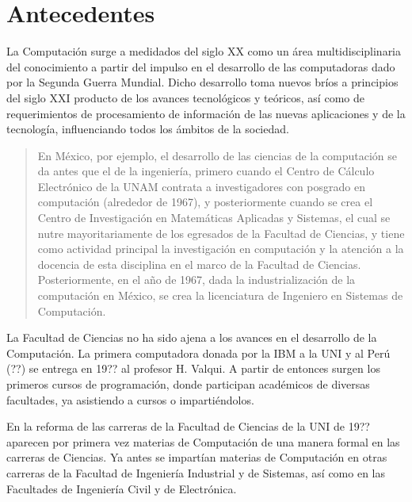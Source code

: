 \section{Antecedentes}\label{sec:cs-antecedentes}

La Computaci\'on surge a medidados del siglo XX como un \'area multidisciplinaria del conocimiento a partir del impulso en el desarrollo de las computadoras dado por la Segunda Guerra Mundial. Dicho desarrollo toma nuevos br\'ios a principios del siglo XXI producto de los avances tecnol\'ogicos y te\'oricos, as\'i como de requerimientos de procesamiento de informaci\'on de las nuevas aplicaciones y de la tecnolog\'ia, influenciando todos los \'ambitos de la sociedad.

\begin{quote}
En M\'exico, por ejemplo, el desarrollo de las ciencias de la computaci\'on se da antes que el de la ingenier\'ia, primero cuando el Centro de C\'alculo Electr\'onico de la UNAM contrata a investigadores con posgrado en computación (alrededor de 1967), y posteriormente cuando se crea el Centro de Investigación en Matem\'aticas Aplicadas y Sistemas, el cual se nutre mayoritariamente de los egresados de la Facultad de Ciencias, y tiene como actividad principal la investigaci\'on en computaci\'on y la atenci\'on a la docencia de esta disciplina en el marco de la Facultad de Ciencias. Posteriormente, en el a\~no de 1967, dada la industrializaci\'on de la computaci\'on en M\'exico, se crea la licenciatura de Ingeniero en Sistemas de Computaci\'on.
\end{quote} 


La Facultad de Ciencias no ha sido ajena a los avances en el desarrollo de la Computaci\'on. La primera computadora donada por la IBM a la UNI y al Per\'u (??) se entrega en 19?? al profesor H. Valqui. A partir de entonces surgen los primeros cursos de programaci\'on, donde participan acad\'emicos de diversas facultades, ya asistiendo a cursos o imparti\'endolos.

En la reforma de las carreras de la Facultad de Ciencias de la UNI de 19?? aparecen por primera vez materias de Computaci\'on de una manera formal en las carreras de Ciencias. Ya antes se impart\'ian materias de Computaci\'on en otras carreras de la Facultad de Ingenier\'ia Industrial y de Sistemas, as\'i como en las Facultades de Ingenier\'ia Civil y de Electr\'onica.
